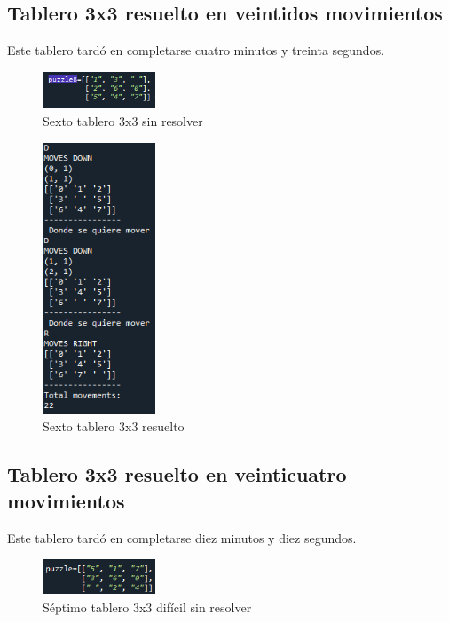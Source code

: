 \documentclass{article}
\begin{document}
    \subsection{Tablero 3x3 resuelto en veintidos movimientos}
    Este tablero tardó en completarse cuatro minutos y treinta segundos.
        \begin{figure}[H]
        \centering
        \includegraphics[width=0.3\textwidth]{puzzles/puzzle6.PNG}
        \caption{Sexto tablero 3x3 sin resolver}
        \label{fig:ger}
        \end{figure}
        
        \begin{figure}[H]
        \centering
        \includegraphics[width=0.3\textwidth]{puzzles/puzzle6Solved.PNG}
        \caption{Sexto tablero 3x3 resuelto}
        \label{fig:ger}
        \end{figure}
        
    \subsection{Tablero 3x3 resuelto en veinticuatro movimientos}
    Este tablero tardó en completarse diez minutos y diez segundos.
        \begin{figure}[H]
        \centering
        \includegraphics[width=0.3\textwidth]{puzzles/puzzle7.PNG}
        \caption{Séptimo tablero 3x3 difícil sin resolver}
        \label{fig:ger}
        \end{figure}
        
\end{document}
